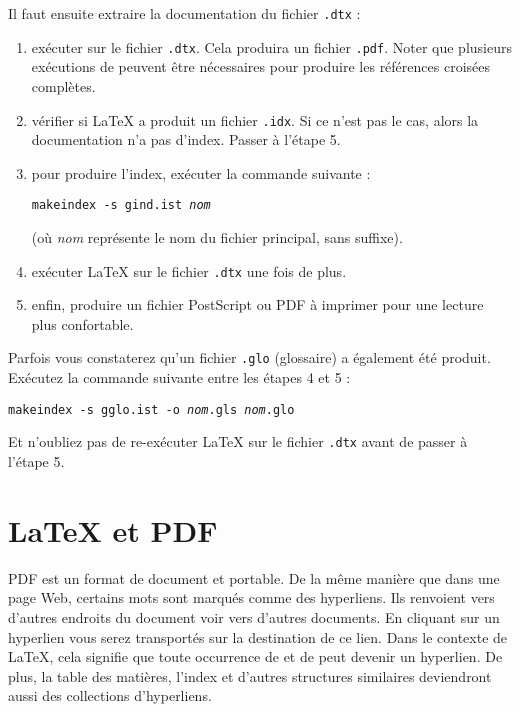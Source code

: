 \noindent Il faut ensuite  extraire la documentation du fichier
\texttt{.dtx} :
\begin{enumerate}
\item exécuter  sur le fichier \texttt{.dtx}. Cela produira un
      fichier \texttt{.pdf}. Noter que plusieurs exécutions de
       peuvent être nécessaires pour produire les références
      croisées complètes.
\item vérifier si \LaTeX{} a produit un fichier \texttt{.idx}. Si ce
      n'est pas le cas, alors la documentation n'a pas d'index. Passer à l'étape 5.
\item pour produire l'index, exécuter la commande suivante :
\begin{lscommand}
\texttt{makeindex -s gind.ist \textit{nom}}
\end{lscommand}
(où \textit{nom} représente le nom du fichier principal, sans
suffixe).
\item exécuter \LaTeX{} sur le fichier \texttt{.dtx} une fois de plus.
\item enfin, produire un fichier PostScript ou PDF à imprimer pour une
      lecture plus confortable.
\end{enumerate}

Parfois vous constaterez qu'un fichier \texttt{.glo} (glossaire) a
également été produit. Exécutez la commande suivante entre les étapes
4 et 5 :

\texttt{makeindex -s gglo.ist -o \textit{nom}\texttt{.gls}
\textit{nom}\texttt{.glo}}

\noindent Et n'oubliez pas de re-exécuter \LaTeX{} sur le fichier
\texttt{.dtx} avant de passer à l'étape 5.



\section{\LaTeX{} et PDF} \label{sec:pdftex}
%

PDF est un format de document  et portable. De la même manière que
dans une page Web, certains mots sont marqués comme des
hyperliens. Ils renvoient vers d'autres endroits du document voir vers
d'autres documents. En cliquant sur un hyperlien vous
serez transportés sur la destination de ce lien. Dans le contexte de
\LaTeX{}, cela signifie que toute occurrence de  et de
 peut devenir un hyperlien. De plus, la table des matières,
l'index et d'autres structures similaires deviendront aussi des
collections d'hyperliens.

